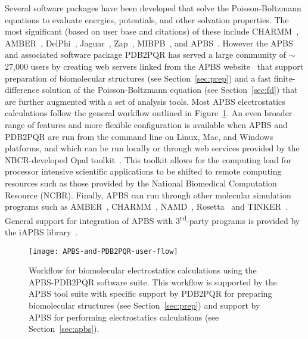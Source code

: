 \documentclass[12pt,titlepage]{article}
\begin{document}
Several software packages have been developed that solve the Poisson-Boltzmann equations to evaluate energies, potentials, and other solvation properties.
The most significant (based on user base and citations) of these include CHARMM~\cite{Brooks2009}, AMBER~\cite{Case2005}, DelPhi~\cite{Sarkar2012}, Jaguar~\cite{Bochevarov2013}, Zap~\cite{Grant2001}, MIBPB~\cite{Zhou2008}, and APBS~\cite{Baker2001a}.
However the APBS and associated software package PDB2PQR has served a large community of $\sim$27,000 users by creating web servers linked from the APBS website~\cite{APBSweb} that support preparation of biomolecular structures (see Section~\ref{sec:prep}) and a fast finite-difference solution of the Poisson-Boltzmann equation (see Section~\ref{sec:fd}) that are further augmented with a set of analysis tools.
Most APBS electrostatics calculations follow the general workflow outlined in Figure~\ref{fig:PDB2PQR-APBS}.
An even broader range of features and more flexible configuration is available when APBS and PDB2PQR are run from the command line on Linux, Mac, and Windows platforms, and which can be run locally or through web services provided by the NBCR-developed Opal toolkit~\cite{Krishnan2009}.
This toolkit allows for the computing load for processor intensive scientific applications to be shifted to remote computing resources such as those provided by the National Biomedical Computation Resource (NCBR).
Finally, APBS can run through other molecular simulation programs such as AMBER~\cite{Case2005}, CHARMM~\cite{Brooks2009}, NAMD~\cite{Phillips2005}, Rosetta~\cite{Rosetta} and TINKER~\cite{TINKER}.
General support for integration of APBS with 3\textsuperscript{rd}-party programs is provided by the iAPBS library~\cite{Konecny2012, iAPBSweb}.
\begin{figure}
	\centering
	\texttt{[image: APBS-and-PDB2PQR-user-flow]} 
	\caption{Workflow for biomolecular electrostatics calculations using the APBS-PDB2PQR software suite. This workflow is supported by the APBS tool suite with specific support by PDB2PQR for preparing biomolecular structures (see Section~\ref{sec:prep}) and support by APBS for performing electrostatics calculations (see Section~\ref{sec:apbs}).}
	\label{fig:PDB2PQR-APBS}
\end{figure}
\end{document}
